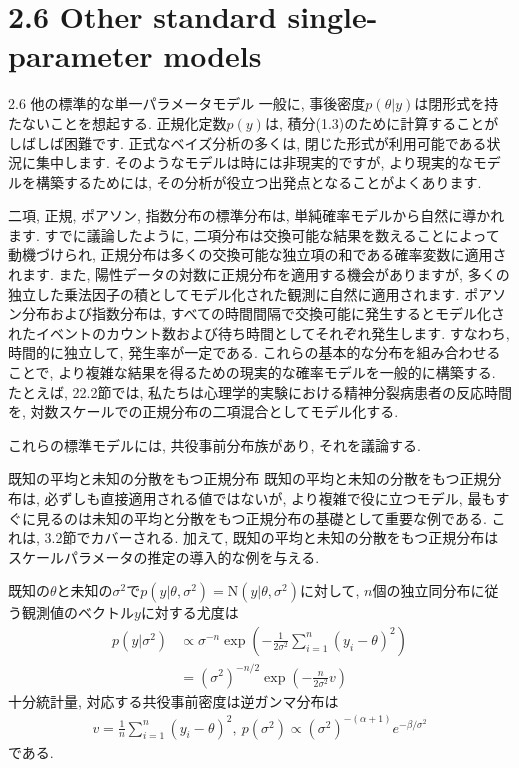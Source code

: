 \documentclass[10pt,dvipdfmx,a4]{beamer}
\newcommand{\eqn}[1]{\begin{align*}#1\end{align*}}
\begin{document}
\section{2.6 Other standard single-parameter models}
\begin{frame}{2.6 他の標準的な単一パラメータモデル}
一般に, 事後密度$p(\theta|y)$は閉形式を持たないことを想起する.
正規化定数$p(y)$は, 積分(1.3)のために計算することがしばしば困難です.
正式なベイズ分析の多くは, 閉じた形式が利用可能である状況に集中します.
そのようなモデルは時には非現実的ですが, より現実的なモデルを構築するためには, その分析が役立つ出発点となることがよくあります.

二項, 正規, ポアソン, 指数分布の標準分布は, 単純確率モデルから自然に導かれます.
すでに議論したように, 二項分布は交換可能な結果を数えることによって動機づけられ, 正規分布は多くの交換可能な独立項の和である確率変数に適用されます.
また, 陽性データの対数に正規分布を適用する機会がありますが, 多くの独立した乗法因子の積としてモデル化された観測に自然に適用されます.
ポアソン分布および指数分布は, すべての時間間隔で交換可能に発生するとモデル化されたイベントのカウント数および待ち時間としてそれぞれ発生します.
すなわち, 時間的に独立して, 発生率が一定である.
これらの基本的な分布を組み合わせることで, より複雑な結果を得るための現実的な確率モデルを一般的に構築する.
たとえば, 22.2節では, 私たちは心理学的実験における精神分裂病患者の反応時間を, 対数スケールでの正規分布の二項混合としてモデル化する.

これらの標準モデルには, 共役事前分布族があり, それを議論する.
\end{frame}


\begin{frame}{既知の平均と未知の分散をもつ正規分布}
既知の平均と未知の分散をもつ正規分布は, 必ずしも直接適用される値ではないが, より複雑で役に立つモデル, 最もすぐに見るのは未知の平均と分散をもつ正規分布の基礎として重要な例である.
これは, 3.2節でカバーされる.
加えて, 既知の平均と未知の分散をもつ正規分布はスケールパラメータの推定の導入的な例を与える.

既知の$\theta$と未知の$\sigma^2$で$p(y|\theta,\sigma^2)=\text{N}(y|\theta,\sigma^2)$に対して, $n$個の独立同分布に従う観測値のベクトル$y$に対する尤度は
\eqn{p(y|\sigma^2)&\propto \sigma^{-n}\exp\left(-\frac{1}{2\sigma^2}\sum_{i=1}^n(y_i-\theta)^2\right)\\
&=(\sigma^2)^{-n/2}\exp \left(-\frac{n}{2\sigma^2}v\right)}
十分統計量, 
対応する共役事前密度は逆ガンマ分布は
\eqn{v=\frac{1}{n}\sum_{i=1}^n(y_i-\theta)^2,\ p(\sigma^2)\propto (\sigma^2)^{-(\alpha+1)}e^{-\beta/\sigma^2}}
である.
\end{frame}
\end{document}
